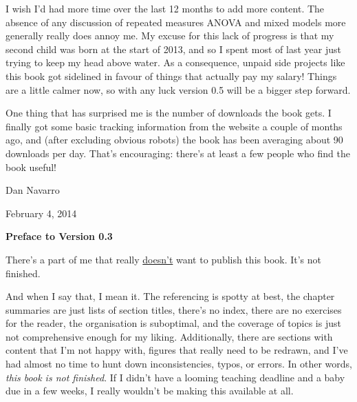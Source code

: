 I wish I'd had more time over the last 12 months to add more content. The absence of any discussion of repeated measures ANOVA and mixed models more generally really does annoy me. My excuse for this lack of progress is that my second child was born at the start of 2013, and so I spent most of last year just trying to keep my head above water. As a consequence, unpaid side projects like this book got sidelined in favour of things that actually pay my salary! Things are a little calmer now, so with any luck version 0.5 will be a bigger step forward.

One thing that has surprised me is the number of downloads the book gets. I finally got some basic tracking information from the website a couple of months ago, and (after excluding obvious robots) the book has been averaging about 90 downloads per day. That's encouraging: there's at least a few people who find the book useful!


\vspace*{24pt}
\noindent
Dan Navarro 

\noindent
February 4, 2014


\vspace*{30pt}



\begin{center}{\Large {\bf Preface to Version 0.3}}\end{center}
\vspace*{12pt}


\noindent
There's a part of me that really \underline{doesn't} want to publish this book. It's not finished. \vsp

And when I say that, I mean it. The referencing is spotty at best, the chapter summaries are just lists of section titles, there's no index, there are no exercises for the reader, the organisation is suboptimal, and the coverage of topics is just not comprehensive enough for my liking. Additionally, there are sections with content that I'm not happy with, figures that really need to be redrawn, and I've had almost no time to hunt down inconsistencies, typos, or errors. In other words, {\it this book is not finished}. If I didn't have a looming teaching deadline and a baby due in a few weeks, I really wouldn't be making this available at all. \vsp

